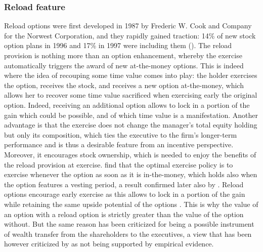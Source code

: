 \subsubsection{Reload feature}
    Reload options were first developed in 1987 by Frederic W. Cook and Company for the Norwest Corporation, and they rapidly gained traction: 14\% of new stock option plans in 1996 and 17\% in 1997 were including them (\cite{dybvig2003employee}).
    The reload provision is nothing more than an option enhancement, whereby the exercise automatically triggers the award of new at-the-money options. This is indeed where the idea of recouping some time value comes into play: the holder exercises the option, receives the stock, and receives a new option at-the-money, which allows her to recover some time value sacrificed when exercising early the original option. Indeed, receiving an additional option allows to lock in a portion of the gain which could be possible, and of which time value is a manifestation. Another advantage is that the exercise does not change the manager's total equity holding but only its composition, which ties the executive to the firm's longer-term performance and is thus a desirable feature from an incentive perspective. Moreover, it encourages stock ownership, which is needed to enjoy the benefits of the reload provision at exercise. 
    \cite{hemmer2000reload} find that the optimal exercise policy is to exercise whenever the option as soon as it is in-the-money, which holds also when the option features a vesting period, a result confirmed later also by \cite{dybvig2003employee}. Reload options encourage early exercise as this allows to lock in a portion of the gain while retaining the same upside potential of the options \cite{hemmer1998optimal}. This is why the value of an option with a reload option is strictly greater than the value of the option without. But the same reason has been criticized for being a possible instrument of wealth transfer from the shareholders to the executives, a view that has been however criticized by \cite{dybvig2003employee} as not being supported by empirical evidence.
